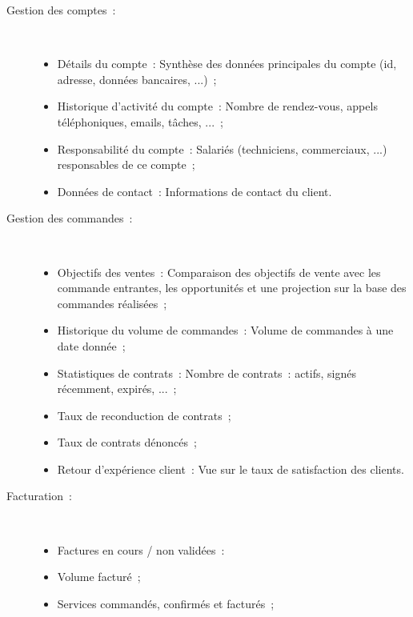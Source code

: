     \begin{description}
        \item[Gestion des comptes~:] ~ \\
            \begin{itemize}
                \item Détails du compte~: Synthèse des données principales du compte (id, adresse, données bancaires, ...)~;
                \item Historique d'activité du compte~: Nombre de rendez-vous, appels téléphoniques, emails, tâches, ...~;
                \item Responsabilité du compte~: Salariés (techniciens, commerciaux, ...) responsables de ce compte~;
                \item Données de contact~: Informations de contact du client.
            \end{itemize}

        \item[Gestion des commandes~:] ~ \\
            \begin{itemize}
                \item Objectifs des ventes~: Comparaison des objectifs de vente avec les commande entrantes, les opportunités et une projection sur la base des commandes réalisées~;
                \item Historique du volume de commandes~: Volume de commandes à une date donnée~;
                \item Statistiques de contrats~: Nombre de contrats~: actifs, signés récemment, expirés, ...~;
                \item Taux de reconduction de contrats~;
                \item Taux de contrats dénoncés~;
                \item Retour d'expérience client~: Vue sur le taux de satisfaction des clients.
            \end{itemize}

        \item[Facturation~:] ~ \\
            \begin{itemize}
                \item Factures en cours / non validées~:
                \item Volume facturé~;
                \item Services commandés, confirmés et facturés~;
            \end{itemize}


\end{description}
